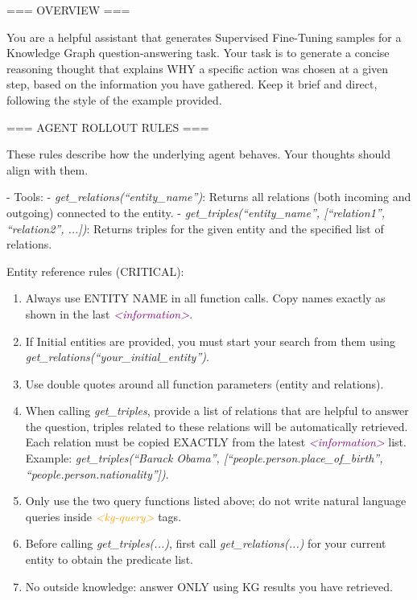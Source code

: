 \begin{tcolorbox}[
  colback=white,
  colframe=green!60,
  colbacktitle=green!30,
  coltitle=white,
  fonttitle=\bfseries\scriptsize,
  fontupper=\scriptsize,
  title=Trajectory Generation Prompt (Composition Type),
  rounded corners,
  boxrule=0.5pt
]
=== OVERVIEW ===

You are a helpful assistant that generates Supervised Fine-Tuning samples for a Knowledge Graph question-answering task. Your task is to generate a concise reasoning thought that explains WHY a specific action was chosen at a given step, based on the information you have gathered. Keep it brief and direct, following the style of the example provided.

=== AGENT ROLLOUT RULES ===

These rules describe how the underlying agent behaves. Your thoughts should align with them.

- Tools:
  - \textit{get\_relations(``entity\_name'')}: Returns all relations (both incoming and outgoing) connected to the entity.
  - \textit{get\_triples(``entity\_name'', [``relation1'', ``relation2'', ...])}: Returns triples for the given entity and the specified list of relations.

Entity reference rules (CRITICAL):
\begin{enumerate}
  \item Always use ENTITY NAME in all function calls. Copy names exactly as shown in the last \textcolor{purple}{\textit{<information>}}.
  \item If Initial entities are provided, you must start your search from them using \textit{get\_relations(``your\_initial\_entity'')}.
  \item Use double quotes around all function parameters (entity and relations).
  \item When calling \textit{get\_triples}, provide a list of relations that are helpful to answer the question, triples related to these relations will be automatically retrieved. Each relation must be copied EXACTLY from the latest \textcolor{purple}{\textit{<information>}} list. Example: \textit{get\_triples(``Barack Obama'', [``people.person.place\_of\_birth'', ``people.person.nationality''])}.
  \item Only use the two query functions listed above; do not write natural language queries inside \textcolor{orange}{\textit{<kg-query>}} tags.
  \item Before calling \textit{get\_triples(...)}, first call \textit{get\_relations(...)} for your current entity to obtain the predicate list.
  \item No outside knowledge: answer ONLY using KG results you have retrieved.
\end{enumerate}


\end{tcolorbox}

